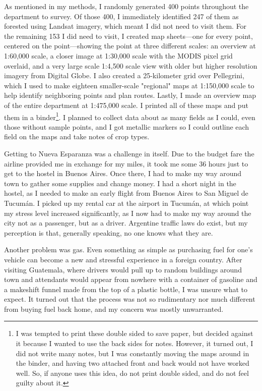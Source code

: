 As mentioned in my methods, I randomly generated 400 points throughout the department to survey. Of those 400, I immediately identified 247 of them as forested using Landsat imagery, which meant I did not need to visit them. For the remaining 153 I did need to visit, I created map sheets—one for every point, centered on the point—showing the point at three different scales: an overview at 1:60,000 scale, a closer image at 1:30,000 scale with the MODIS pixel grid overlaid, and a very large scale 1:4,500 scale view with older but higher resolution imagery from Digital Globe. I also created a 25-kilometer grid over Pellegrini, which I used to make eighteen smaller-scale "regional" maps at 1:150,000 scale to help identify neighboring points and plan routes. Lastly, I made an overview map of the entire department at 1:475,000 scale. I printed all of these maps and put them in a binder\footnote{I was tempted to print these double sided to save paper, but decided against it because I wanted to use the back sides for notes. However, it turned out, I did not write many notes, but I was constantly moving the maps around in the binder, and having two attached front and back would not have worked well. So, if anyone uses this idea, do not print double sided, and do not feel guilty about it.}. I planned to collect data about as many fields as I could, even those without sample points, and I got metallic markers so I could outline each field on the maps and take notes of crop types.

Getting to Nueva Esparanza was a challenge in itself. Due to the budget fare the airline provided me in exchange for my miles, it took me some 36 hours just to get to the hostel in Buenos Aires. Once there, I had to make my way around town to gather some supplies and change money. I had a short night in the hostel, as I needed to make an early flight from Buenos Aires to San Miguel de Tucumán. I picked up my rental car at the airport in Tucumán, at which point my stress level increased significantly, as I now had to make my way around the city not as a passenger, but as a driver. Argentine traffic laws do exist, but my perception is that, generally speaking, no one knows what they are.

Another problem was gas. Even something as simple as purchasing fuel for one’s vehicle can become a new and stressful experience in a foreign country. After visiting Guatemala, where drivers would pull up to random buildings around town and attendants would appear from nowhere with a container of gasoline and a makeshift funnel made from the top of a plastic bottle, I was unsure what to expect. It turned out that the process was not so rudimentary nor much different from buying fuel back home, and my concern was mostly unwarranted.

